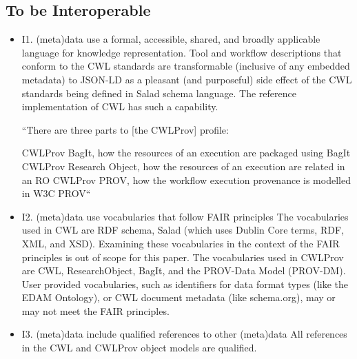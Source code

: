 \subsection{To be Interoperable}
\begin{itemize}
\item I1. (meta)data use a formal, accessible, shared, and broadly applicable language for knowledge representation.
Tool and workflow descriptions that conform to the CWL standards are transformable (inclusive of any embedded metadata) to JSON-LD as a pleasant (and purposeful) side effect of the CWL standards being defined in Salad schema language. The reference implementation of CWL has such a capability.

“There are three parts to [the CWLProv] profile:

	CWLProv BagIt, how the resources of an execution are packaged using BagIt
	CWLProv Research Object, how the resources of an execution are related in an RO
	CWLProv PROV, how the workflow execution provenance is modelled in W3C PROV“
\item I2. (meta)data use vocabularies that follow FAIR principles
The vocabularies used in CWL are RDF schema, Salad (which uses Dublin Core terms, RDF, XML, and XSD). Examining these vocabularies in the context of the FAIR principles is out of scope for this paper. The vocabularies used in CWLProv are CWL, ResearchObject, BagIt, and the PROV-Data Model (PROV-DM). User provided vocabularies, such as identifiers for data format types (like the EDAM Ontology), or CWL document metadata (like schema.org), may or may not meet the FAIR principles.
\item I3. (meta)data include qualified references to other (meta)data
All references in the CWL and CWLProv object models are qualified.
\end{itemize}
